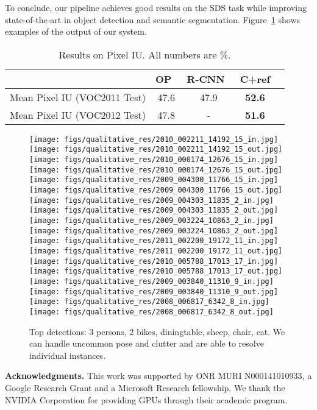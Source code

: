 \documentclass[runningheads]{llncs}
\newcommand\methodC{\textbf{C}}
\begin{document}
To conclude, our pipeline achieves good results on the SDS task while improving state-of-the-art in object detection and semantic segmentation. Figure~\ref{fig:examples} shows examples of the output of our system.
\begin{table}
\centering
\caption{Results on Pixel IU. All numbers are \%.}
\small{
\begin{tabular}{l|cccc}
& OP~\cite{CarreiraECCV12} & R-CNN~\cite{GirshickCVPR14} & \methodC{}+ref\\
\hline
Mean Pixel IU (VOC2011 Test) & 47.6 & 47.9 & \textbf{52.6} \\
Mean Pixel IU (VOC2012 Test) & 47.8 & - & \textbf{51.6}\\
\end{tabular}
}
\label{pixelIU}
\end{table}

\begin{figure}
\centering
\texttt{[image: figs/qualitative\_res/2010\_002211\_14192\_15\_in.jpg]}
\texttt{[image: figs/qualitative\_res/2010\_002211\_14192\_15\_out.jpg]}
\texttt{[image: figs/qualitative\_res/2010\_000174\_12676\_15\_in.jpg]}
\texttt{[image: figs/qualitative\_res/2010\_000174\_12676\_15\_out.jpg]}
\texttt{[image: figs/qualitative\_res/2009\_004300\_11766\_15\_in.jpg]}
\texttt{[image: figs/qualitative\_res/2009\_004300\_11766\_15\_out.jpg]}\\
\texttt{[image: figs/qualitative\_res/2009\_004303\_11835\_2\_in.jpg]}
\texttt{[image: figs/qualitative\_res/2009\_004303\_11835\_2\_out.jpg]}
\texttt{[image: figs/qualitative\_res/2009\_003224\_10863\_2\_in.jpg]}
\texttt{[image: figs/qualitative\_res/2009\_003224\_10863\_2\_out.jpg]}
\texttt{[image: figs/qualitative\_res/2011\_002200\_19172\_11\_in.jpg]}
\texttt{[image: figs/qualitative\_res/2011\_002200\_19172\_11\_out.jpg]}\\
\texttt{[image: figs/qualitative\_res/2010\_005788\_17013\_17\_in.jpg]}
\texttt{[image: figs/qualitative\_res/2010\_005788\_17013\_17\_out.jpg]}
\texttt{[image: figs/qualitative\_res/2009\_003840\_11310\_9\_in.jpg]}
\texttt{[image: figs/qualitative\_res/2009\_003840\_11310\_9\_out.jpg]}
\texttt{[image: figs/qualitative\_res/2008\_006817\_6342\_8\_in.jpg]}
\texttt{[image: figs/qualitative\_res/2008\_006817\_6342\_8\_out.jpg]}
\caption{  Top detections:  3 persons, 2 bikes, diningtable, sheep, chair, cat. We can handle uncommon pose and clutter and are able to resolve individual instances. }
\label{fig:examples}
\end{figure}
\scriptsize{
\noindent\textbf{Acknowledgments.}
This work was supported by ONR MURI N000141010933, a Google Research Grant and a Microsoft Research fellowship. We thank the NVIDIA Corporation for providing GPUs through their academic program.
}
 \clearpage



\end{document}
